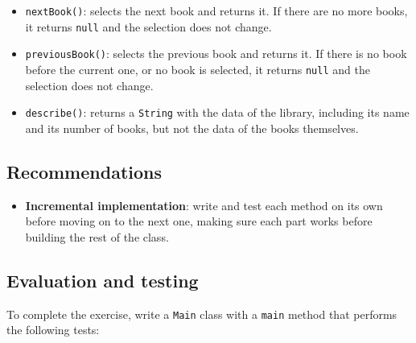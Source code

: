 \begin{itemize}
\begin{itemize}
            \item \texttt{nextBook()}: selects the next book and returns it. If there are no more books, it returns \texttt{null} and the selection does not change.

            \item \texttt{previousBook()}: selects the previous book and returns it. If there is no book before the current one, or no book is selected, it returns \texttt{null} and the selection does not change.

            \item \texttt{describe()}: returns a \texttt{String} with the data of the library, including its name and its number of books, but not the data of the books themselves.

        \end{itemize}

\end{itemize}

\subsection{Recommendations}

\begin{itemize}

    \item \textbf{Incremental implementation}: write and test each method on its own before moving on to the next one, making sure each part works before building the rest of the class.

\end{itemize}

\subsection{Evaluation and testing}

To complete the exercise, write a \texttt{Main} class with a \texttt{main} method that performs the following tests:

